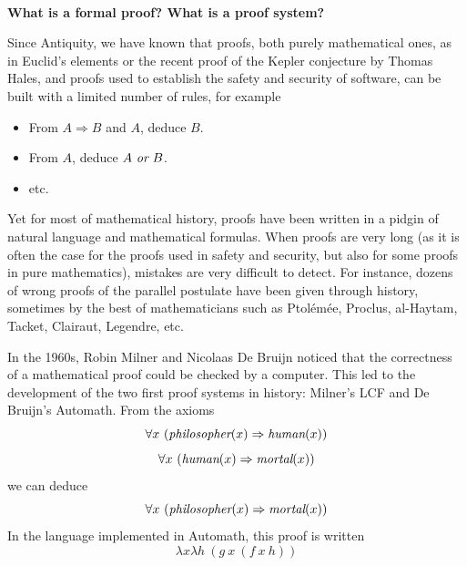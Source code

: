 \vfill~
\pagebreak
\begin{framed}
  \vspace*{-0.5cm}
  \begin{center}
    {\bf \Large What is a formal proof? What is a proof system?}
    \end{center}

Since Antiquity, we have known that
proofs, both purely mathematical ones, as in Euclid's elements or the
recent proof of the Kepler conjecture by Thomas Hales, and proofs used
to establish the safety and security of software, can be built with a
limited number of rules, for example
\begin{itemize}
\item From $A \Rightarrow B$ and $A$, deduce $B$.
\item From $A$, deduce $A~\mbox{\it or}~B$.
\item etc.
\end{itemize}
Yet for most of mathematical history, proofs have been written in
a pidgin of natural language and mathematical formulas. When proofs are
very long (as it is often the case for the proofs used in safety and security,
but also for some proofs in pure mathematics), mistakes are
very difficult to detect. For instance, dozens of wrong proofs of
the parallel postulate have been given through history, sometimes by the
best of mathematicians such as Ptolémée, Proclus, al-Haytam, Tacket,
Clairaut, Legendre, etc.

In the 1960s, Robin Milner and Nicolaas De Bruijn noticed that the
correctness of a mathematical proof could be checked by a
computer. This led to the development of the two first proof systems
in history: Milner's LCF and De Bruijn's Automath.  From
the axioms
$$\forall x~(\mbox{\em philosopher}(x) \Rightarrow \mbox{\em human}(x))$$
$$\forall x~(\mbox{\em human}(x) \Rightarrow \mbox{\em mortal}(x))$$
we can deduce
$$\forall x~(\mbox{\em philosopher}(x) \Rightarrow \mbox{\em mortal}(x))$$
In the language implemented in Automath, this proof is written
$$\lambda x \lambda h~(g~x~(f~x~h))$$
\end{framed}

\vfill

